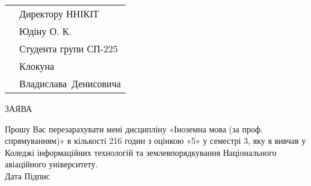 \documentclass[a4paper,oneside,DIV=9,12pt]{scrartcl}
\begin{document}
	\pagestyle{empty}
%		
	
	\begin{tabular}{p{228pt}l}
		& Директору ННІКІТ\\
		& Юдіну О. К.\\
		& Студента групи СП-225\\
		& Клокуна\\
		& Владислава~Денисовича\\
	\end{tabular}
	
	\begin{center}
	ЗАЯВА
	\end{center}
	
	Прошу Вас перезарахувати мені дисципліну «Іноземна мова (за проф. спрямуванням)» в кількості 216 годин з оцінкою «5» у семестрі 3, яку я вивчав у Коледжі інформаційних технологій та землевпорядкування Національного авіаційного університету.\\[1cm]
	
	\noindent Дата \hspace{\fill} Підпис
	
\end{document}
